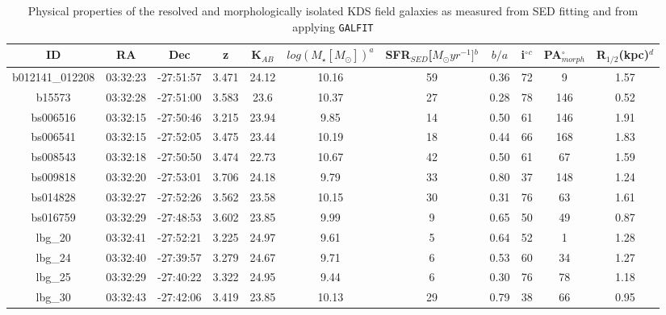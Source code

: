 \documentclass[fleqn,usenatbib]{mn2e}
\begin{document}
\begin{table*}
\centering
\begin{threeparttable}
\caption{Physical properties of the resolved and morphologically isolated KDS field galaxies as measured from SED fitting and from applying {\tt GALFIT} \protect\citep{Peng2010_galfit}}
\label{tab:phys-props}
\begin{tabular}{ccccccccccc}


 \hline
ID              & RA       & Dec       & z     & K$_{AB}$     & $log(M_{\star}[M_{\odot}])^{a}$ & SFR$_{SED}$[$M_{\odot}yr^{-1}]$$^{b}$ & $b/a$ & i$^{\circ}$$^{c}$ & PA$_{morph}^{\circ}$ & R$_{1/2}$(kpc)$^{d}$ \\
 \hline
b012141\_012208 & 03:32:23 & -27:51:57 & 3.471        & 24.12  & 10.16 & 59 & 0.36        & 72        & 9     & 1.57      \\
b15573          & 03:32:28 & -27:51:00 & 3.583        & 23.6   & 10.37 & 27 & 0.28        & 78        & 146   & 0.52      \\
bs006516        & 03:32:15 & -27:50:46 & 3.215        & 23.94  & 9.85  & 14 & 0.50         & 61        & 146   & 1.91      \\
bs006541        & 03:32:15 & -27:52:05 & 3.475       & 23.44  & 10.19 & 18 & 0.44        & 66        & 168   & 1.83      \\
bs008543        & 03:32:18 & -27:50:50 & 3.474        & 22.73  & 10.67 & 42 & 0.50         & 61        & 67    & 1.59      \\
bs009818        & 03:32:20 & -27:53:01 & 3.706        & 24.18  & 9.79  & 33 & 0.80         & 37        & 148   & 1.24      \\
bs014828        & 03:32:27 & -27:52:26 & 3.562        & 23.58  & 10.15 & 30 & 0.31        & 76        & 63    & 1.61      \\
bs016759        & 03:32:29 & -27:48:53 & 3.602       & 23.85  & 9.99  & 9  & 0.65        & 50        & 49    & 0.87      \\
lbg\_20         & 03:32:41 & -27:52:21 & 3.225        & 24.97  & 9.61  & 5  & 0.64        & 52        & 1     & 1.28      \\
lbg\_24         & 03:32:40 & -27:39:57 & 3.279       & 24.67  & 9.71  & 6  & 0.53        & 60        & 34    & 1.27      \\
lbg\_25         & 03:32:29 & -27:40:22 & 3.322        & 24.95  & 9.44  & 6  & 0.30         & 76        & 78    & 1.18      \\
lbg\_30         & 03:32:43 & -27:42:06 & 3.419        & 23.85  & 10.13  & 29  & 0.79         & 38        & 66    & 0.95      \\

\end{tabular}
\end{threeparttable}
\end{table*}
\end{document}
